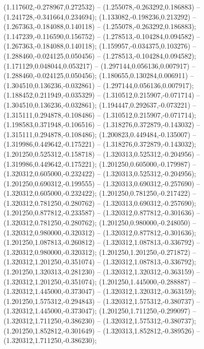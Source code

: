  (1.117602,-0.278967,0.272532) -- (1.255078,-0.263292,0.186883) -- (1.241728,-0.341664,0.234694);
 (1.133082,-0.198236,0.213292) -- (1.267363,-0.184088,0.140118) -- (1.255078,-0.263292,0.186883);
 (1.147239,-0.116590,0.156752) -- (1.278513,-0.104284,0.094582) -- (1.267363,-0.184088,0.140118);
 (1.159957,-0.034375,0.103276) -- (1.288460,-0.024125,0.050456) -- (1.278513,-0.104284,0.094582);
 (1.171129,0.048044,0.053217) -- (1.297144,0.056136,0.007917) -- (1.288460,-0.024125,0.050456);
 (1.180655,0.130284,0.006911) -- (1.304510,0.136236,-0.032861) -- (1.297144,0.056136,0.007917);
 (1.188452,0.211949,-0.035329) -- (1.310512,0.215907,-0.071714) -- (1.304510,0.136236,-0.032861);
 (1.194447,0.292637,-0.073221) -- (1.315111,0.294878,-0.108486) -- (1.310512,0.215907,-0.071714);
 (1.198583,0.371948,-0.106516) -- (1.318276,0.372879,-0.143032) -- (1.315111,0.294878,-0.108486);
 (1.200823,0.449484,-0.135007) -- (1.319986,0.449642,-0.175221) -- (1.318276,0.372879,-0.143032);
 (1.201250,0.525312,-0.158718) -- (1.320313,0.525312,-0.204956) -- (1.319986,0.449642,-0.175221);
 (1.201250,0.605000,-0.179987) -- (1.320312,0.605000,-0.232422) -- (1.320313,0.525312,-0.204956);
 (1.201250,0.690312,-0.199555) -- (1.320313,0.690312,-0.257690) -- (1.320312,0.605000,-0.232422);
 (1.201250,0.781250,-0.217422) -- (1.320312,0.781250,-0.280762) -- (1.320313,0.690312,-0.257690);
 (1.201250,0.877812,-0.233587) -- (1.320312,0.877812,-0.301636) -- (1.320312,0.781250,-0.280762);
 (1.201250,0.980000,-0.248050) -- (1.320312,0.980000,-0.320312) -- (1.320312,0.877812,-0.301636);
 (1.201250,1.087813,-0.260812) -- (1.320312,1.087813,-0.336792) -- (1.320312,0.980000,-0.320312);
 (1.201250,1.201250,-0.271872) -- (1.320312,1.201250,-0.351074) -- (1.320312,1.087813,-0.336792);
 (1.201250,1.320313,-0.281230) -- (1.320312,1.320312,-0.363159) -- (1.320312,1.201250,-0.351074);
 (1.201250,1.445000,-0.288887) -- (1.320312,1.445000,-0.373047) -- (1.320312,1.320312,-0.363159);
 (1.201250,1.575312,-0.294843) -- (1.320312,1.575312,-0.380737) -- (1.320312,1.445000,-0.373047);
 (1.201250,1.711250,-0.299097) -- (1.320312,1.711250,-0.386230) -- (1.320312,1.575312,-0.380737);
 (1.201250,1.852812,-0.301649) -- (1.320313,1.852812,-0.389526) -- (1.320312,1.711250,-0.386230);
